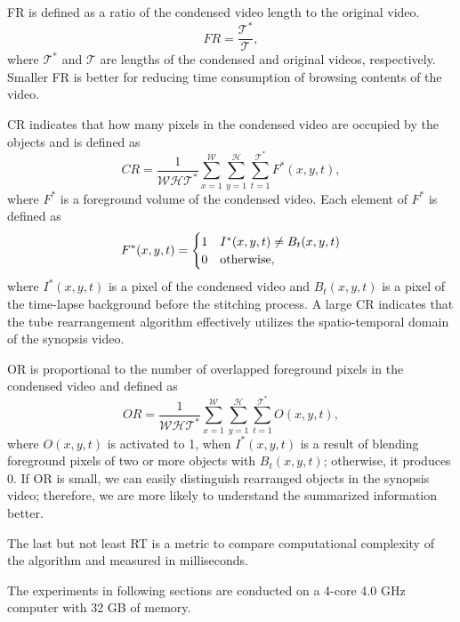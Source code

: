 \documentclass[11pt]{hyu_thesis}
\begin{document}
FR is defined as a ratio of the condensed video length to the original video.
\begin{equation}
FR = \frac{\mathcal{T}^{*}}{\mathcal{T}},
\end{equation}
where $\mathcal{T}^{*}$ and $\mathcal{T}$ are lengths of the condensed and original videos, respectively. Smaller FR is better for reducing time consumption of browsing contents of the video.

CR indicates that how many pixels in the condensed video are occupied by the objects and is defined as
\begin{equation}
\label{eq:CR}
CR=\frac{1}{\mathcal{W}\mathcal{H}\mathcal{T}^{*}}\sum_{x=1}^{\mathcal{W}}\sum_{y=1}^{\mathcal{H}}\sum_{t=1}^{\mathcal{T}^{*}} F^{*}(x,y,t),
\end{equation}
where $F^{*}$ is a foreground volume of the condensed video. Each element of $F^{*}$ is defined as
\begin{equation}
F^{*}(x,y,t)=
\begin{cases}
1 & I^{*}(x,y,t) \neq B_t(x,y,t)\\
0 & \rm{otherwise},
\end{cases}
\end{equation}
where $I^{*}(x,y,t)$ is a pixel of the condensed video and $B_t(x,y,t)$ is a pixel of the time-lapse background before the stitching process. A large CR indicates that the tube rearrangement algorithm effectively utilizes the spatio-temporal domain of the synopsis video.

OR is proportional to the number of overlapped foreground pixels in the condensed video and defined as
\begin{equation}
OR=\frac{1}{\mathcal{W}\mathcal{H}\mathcal{T}^{*}}\sum_{x=1}^{\mathcal{W}}\sum_{y=1}^{\mathcal{H}}\sum_{t=1}^{\mathcal{T}^{*}} O(x,y,t),
\end{equation}
where $O(x,y,t)$ is activated to 1, when $I^{*}(x,y,t)$ is a result of blending foreground pixels of two or more objects with $B_t(x,y,t)$; otherwise, it produces 0. If OR is small, we can easily distinguish rearranged objects in the synopsis video; therefore, we are more likely to understand the summarized information better.

The last but not least RT is a metric to compare computational complexity of the algorithm and measured in milliseconds. 

 The experiments in following sections are conducted on a 4-core 4.0 GHz computer with 32 GB of memory. 
\end{document}
